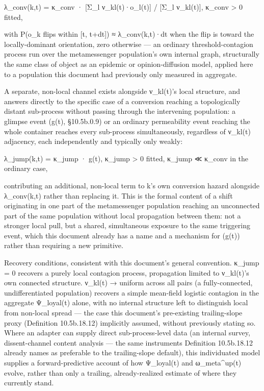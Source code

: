 \documentclass[
]{article}
\begin{document}
λ\_conv(k,t) = κ\_conv · {[}Σ\_l ν\_kl(t)·o\_l(t){]} / {[}Σ\_l
ν\_kl(t){]}, κ\_conv \textgreater{} 0 fitted,

with P(o\_k flips within {[}t, t+dt{]}) ≈ λ\_conv(k,t)·dt when the
flip is toward the locally-dominant orientation, zero otherwise  ---
an ordinary threshold-contagion process run over the metamessenger
population's own internal graph, structurally the same class of object
as an epidemic or opinion-diffusion model, applied here to a
population this document had previously only measured in aggregate.

A separate, non-local channel exists alongside ν\_kl(t)'s local
structure, and answers directly to the specific case of a conversion
reaching a topologically distant sub-process without passing through
the intervening population: a glimpse event (g(t), §10.5b.0.9) or an
ordinary permeability event reaching the whole container reaches every
sub-process simultaneously, regardless of ν\_kl(t) adjacency, each
independently and typically only weakly:

λ\_jump(k,t) = κ\_jump · g(t), κ\_jump \textgreater{} 0 fitted,
κ\_jump ≪ κ\_conv in the ordinary case,

contributing an additional, non-local term to k's own conversion
hazard alongside λ\_conv(k,t) rather than replacing it. This is the
formal content of a shift originating in one part of the metamessenger
population reaching an unconnected part of the same population without
local propagation between them: not a stronger local pull, but a
shared, simultaneous exposure to the same triggering event, which this
document already has a name and a mechanism for (g(t)) rather than
requiring a new primitive.

Recovery conditions, consistent with this document's general
convention. κ\_jump = 0 recovers a purely local contagion process,
propagation limited to ν\_kl(t)'s own connected structure. ν\_kl(t) →
uniform across all pairs (a fully-connected, undifferentiated
population) recovers a simple mean-field logistic contagion in the
aggregate Ψ\_loyal(t) alone, with no internal structure left to
distinguish local from non-local spread  ---  the case this document's
pre-existing trailing-slope proxy (Definition 10.5b.18.12) implicitly
assumed, without previously stating so. Where an adapter can supply
direct sub-process-level data (an internal survey, dissent-channel
content analysis  ---  the same instruments Definition 10.5b.18.12
already names as preferable to the trailing-slope default), this
individuated model supplies a forward-predictive account of how
Ψ\_loyal(t) and ω\_meta\^{}up(t) evolve, rather than only a trailing,
already-realized estimate of where they currently stand.
\end{document}
